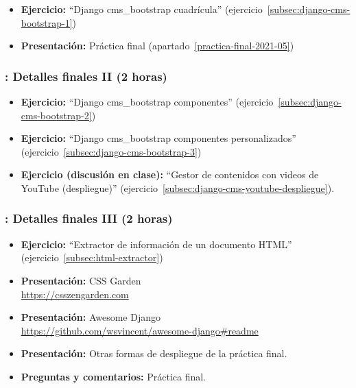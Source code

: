 \documentclass[a4paper,12pt]{article}
\begin{document}
 \begin{itemize}
   \item \textbf{Ejercicio:} ``Django cms\_bootstrap cuadrícula'' (ejercicio~\ref{subsec:django-cms-bootstrap-1})
   \item \textbf{Presentación:} Práctica final (apartado~\ref{practica-final-2021-05})
\end{itemize}

\subsubsection{\lunesX: Detalles finales II (2 horas)}
\label{cal:lunesM}

\begin{itemize}
   \item \textbf{Ejercicio:} ``Django cms\_bootstrap componentes'' (ejercicio~\ref{subsec:django-cms-bootstrap-2})
\item \textbf{Ejercicio:} ``Django cms\_bootstrap componentes personalizados'' (ejercicio~\ref{subsec:django-cms-bootstrap-3})
\item \textbf{Ejercicio (discusión en clase):} ``Gestor de contenidos con videos de YouTube (despliegue)'' (ejercicio~\ref{subsec:django-cms-youtube-despliegue}).
\end{itemize}

 \subsubsection{\lunesX: Detalles finales III  (2 horas)}
 \label{cal:lunesO}

 \begin{itemize}
 \item \textbf{Ejercicio:} ``Extractor de información de un documento HTML'' (ejercicio~\ref{subsec:html-extractor})
 \item \textbf{Presentación:} CSS Garden \\
   \url{https://csszengarden.com}
 \item \textbf{Presentación:} Awesome Django \\
   \url{https://github.com/wsvincent/awesome-django#readme}
 \item \textbf{Presentación:} Otras formas de despliegue de la práctica final.
 \item \textbf{Preguntas y comentarios:} Práctica final.
 \end{itemize}
\end{document}

